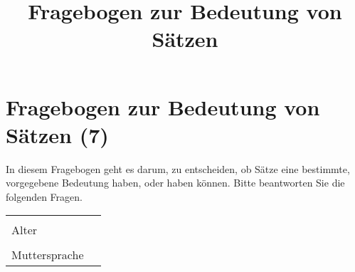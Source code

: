 \documentclass[a4paper, 8pt]{article}
\title{Fragebogen zur Bedeutung von Sätzen}
\begin{document}
\section*{Fragebogen zur Bedeutung von Sätzen (7)}

In diesem Fragebogen geht es darum, zu entscheiden, ob Sätze eine bestimmte, vorgegebene Bedeutung haben, oder haben können. Bitte beantworten Sie die folgenden Fragen.


\begin{tabular}{|l|p{5cm}|}
\hline
& \\
Alter & \\
\hline
& \\
Muttersprache & \\
\hline
\end{tabular}
\end{document}
